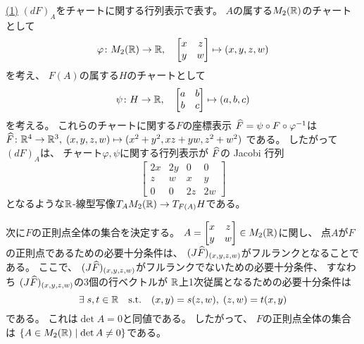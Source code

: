 \documentclass[report]{jlreq}
\begin{document}
\begin{answer}
    \uline{(1)} \quad
    $(dF)_A$をチャートに関する行列表示で表す。
    $A$の属する$M_2(\mathbb{R})$のチャートとして
    \begin{equation}
        \varphi \colon M_2(\mathbb{R}) \to \mathbb{R},
            \quad
            \begin{bmatrix}
                x & z \\
                y & w
            \end{bmatrix}
            \mapsto
            (x, y, z, w)
    \end{equation}
    を考え、
    $F(A)$の属する$H$のチャートとして
    \begin{equation}
        \psi \colon H \to \mathbb{R},
            \quad
            \begin{bmatrix}
                a & b \\
                b & c
            \end{bmatrix}
            \mapsto
            (a, b, c)
    \end{equation}
    を考える。
    これらのチャートに関する$F$の座標表示
    $\widehat{F} = \psi \circ F \circ \varphi^{-1}$は
    $\widehat{F} \colon \mathbb{R}^4 \to \mathbb{R}^3, \;
        (x, y, z, w) \mapsto (x^2 + y^2, xz + yw, z^2 + w^2)$
    である。
    したがって$(dF)_A$は、
    チャート$\varphi, \psi$に関する行列表示が
    $\widehat{F}$の Jacobi 行列
    \begin{equation}
        \begin{bmatrix}
            2x & 2y & 0 & 0 \\
            z & w & x & y \\
            0 & 0 & 2z & 2w
        \end{bmatrix}
    \end{equation}
    となるような$\mathbb{R}$-線型写像$T_AM_2(\mathbb{R}) \to T_{F(A)}H$である。

    次に$F$の正則点全体の集合を決定する。
    $A = \begin{bmatrix}
        x & z \\
        y & w
    \end{bmatrix} \in M_2(\mathbb{R})$に関し、
    点$A$が$F$の正則点であるための必要十分条件は、
    $(J\widehat{F})_{(x, y, z, w)}$がフルランクとなることである。
    ここで、
    $(J\widehat{F})_{(x, y, z, w)}$がフルランクでないための必要十分条件、
    すなわち
    $(J\widehat{F})_{(x, y, z, w)}$の3個の行ベクトルが
    $\mathbb{R}$上1次従属となるための必要十分条件は
    \begin{equation}
        \exists \; s, t \in \mathbb{R}
            \quad \text{s.t.} \quad
            (x, y) = s(z, w), \; (z, w) = t(x, y)
    \end{equation}
    である。
    これは$\det A = 0$と同値である。
    したがって、
    $F$の正則点全体の集合は
    $\{ A \in M_2(\mathbb{R}) \mid \det A \neq 0 \}$である。


\end{answer}
\end{document}
